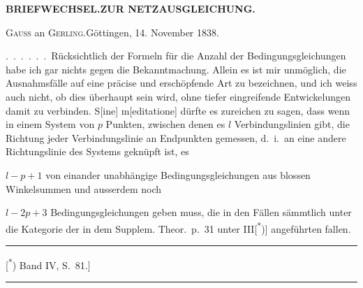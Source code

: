 \hfill\textbf{BRIEFWECHSEL.\quad ZUR NETZAUSGLEICHUNG.}
\begin{center}\textsc{Gauss} an \textsc{Gerling}.\quad Göttingen, 14. November 1838.\end{center}

.\ .\ .\ .\ .\ .\ Rücksichtlich der Formeln für die Anzahl der Bedingungsgleichungen
habe ich gar nichts gegen die Bekanntmachung. Allein es ist mir
 unmöglich, die Ausnahmsfälle auf eine präcise und erschöpfende Art
zu bezeichnen, und ich weiss auch nicht, ob dies überhaupt  sein
wird, ohne tiefer eingreifende Entwickelungen damit zu verbinden. S[ine] m[editatione]
dürfte es zureichen zu sagen, dass wenn in einem System von $p$
Punkten, zwischen denen es $l$ Verbindungslinien gibt, die Richtung jeder Verbindungslinie
an  Endpunkten gemessen, d.\ i.\ an eine andere Richtungslinie
des Systems geknüpft ist, es

$l-p+1$ von einander unabhängige Bedingungsgleichungen aus blossen
Winkelsummen und ausserdem noch

$l-2p+3$  Bedingungsgleichungen geben muss, die in den
 Fällen sämmtlich unter die Kategorie der in dem Supplem.
Theor.\ p.\ 31 unter III[\textsuperscript{*})] angeführten fallen.
\par\medskip
\noindent\rule{.24\textwidth}{.4pt}\par\smallskip
{\footnotesize\noindent\hspace*{1.5em}[\textsuperscript{*}) Band IV, S.\ 81.]\par}
\vspace{2em}
\begin{center}\rule{.18\textwidth}{.4pt}\end{center}
